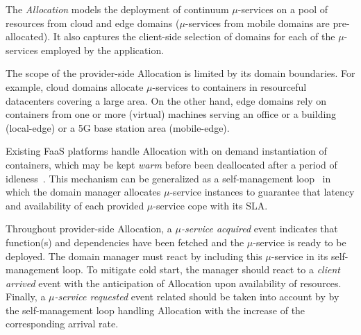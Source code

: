 The \textit{Allocation} models the deployment of continuum $\mu$-services on a pool of resources from cloud and edge domains ($\mu$-services from mobile domains are pre-allocated). It also captures the client-side selection of domains for each of the $\mu$-services employed by the application.


The scope of the provider-side Allocation is limited by its domain boundaries. For example, cloud domains allocate $\mu$-services to containers in resourceful datacenters covering a large area. On the other hand, edge domains rely on containers from one or more (virtual) machines serving an office or a building (local-edge) or a 5G base station area (mobile-edge). %

Existing FaaS platforms handle Allocation with on demand instantiation of containers, which may be kept \textit{warm} before been deallocated after a period of idleness~\cite{AWSLambda, OpenWhisk}. This mechanism can be generalized as a self-management loop~\cite{kephart2003vision} in which the domain manager allocates $\mu$-service instances to guarantee that latency and availability of each provided $\mu$-service cope with its SLA. 


Throughout provider-side Allocation, a \textit{$\mu$-service acquired} event indicates that function(s) and dependencies have been fetched and the $\mu$-service is ready to be deployed. The domain manager must react by including this $\mu$-service in its self-management loop. To mitigate cold start, the manager should react to a \textit{client arrived} event with the anticipation of Allocation upon availability of resources. Finally, a \textit{$\mu$-service requested} event related should be taken into account by by the self-management loop handling Allocation with the increase of the corresponding arrival rate.



